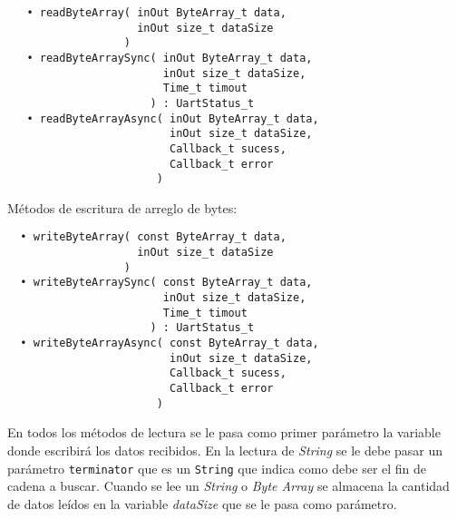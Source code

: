\begin{verbatim}
   • readByteArray( inOut ByteArray_t data,
                    inOut size_t dataSize
                  )
   • readByteArraySync( inOut ByteArray_t data,
                        inOut size_t dataSize,
                        Time_t timout
                      ) : UartStatus_t
   • readByteArrayAsync( inOut ByteArray_t data, 
                         inOut size_t dataSize,
                         Callback_t sucess,
                         Callback_t error 
                       )
\end{verbatim}

Métodos de escritura de arreglo de bytes:

\begin{verbatim}
  • writeByteArray( const ByteArray_t data,
                    inOut size_t dataSize
                  )
  • writeByteArraySync( const ByteArray_t data,
                        inOut size_t dataSize,
                        Time_t timout
                      ) : UartStatus_t
  • writeByteArrayAsync( const ByteArray_t data, 
                         inOut size_t dataSize,
                         Callback_t sucess,
                         Callback_t error
                       )
\end{verbatim}

En todos los métodos de lectura se le pasa como primer parámetro la variable donde escribirá los datos recibidos. En la lectura de \emph{String} se le debe pasar un parámetro \texttt{terminator} que es un \texttt{String} que indica como debe ser el fin de cadena a buscar. Cuando se lee un \emph{String} o \emph{Byte Array} se almacena la cantidad de datos leídos en la variable \emph{dataSize} que se le pasa como parámetro.
